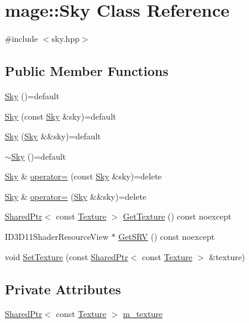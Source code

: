 \hypertarget{classmage_1_1_sky}{}\section{mage\+:\+:Sky Class Reference}
\label{classmage_1_1_sky}


{\ttfamily \#include $<$sky.\+hpp$>$}

\subsection*{Public Member Functions}
\begin{DoxyCompactItemize}
\item 
\hyperlink{classmage_1_1_sky_a4e54074f11814aee89e2554f35e551aa}{Sky} ()=default
\item 
\hyperlink{classmage_1_1_sky_ab041650afed6344cd7874308def5c35c}{Sky} (const \hyperlink{classmage_1_1_sky}{Sky} \&sky)=default
\item 
\hyperlink{classmage_1_1_sky_acf43250f4e0af2e3ab262c6c36b19a9a}{Sky} (\hyperlink{classmage_1_1_sky}{Sky} \&\&sky)=default
\item 
\hyperlink{classmage_1_1_sky_a42c605bd010c1c6576c3ecf32cd0e962}{$\sim$\+Sky} ()=default
\item 
\hyperlink{classmage_1_1_sky}{Sky} \& \hyperlink{classmage_1_1_sky_a1ed7e2e383a87025347ee63b25f0f544}{operator=} (const \hyperlink{classmage_1_1_sky}{Sky} \&sky)=delete
\item 
\hyperlink{classmage_1_1_sky}{Sky} \& \hyperlink{classmage_1_1_sky_a07e7ad68f471344d06357ea68b82ef84}{operator=} (\hyperlink{classmage_1_1_sky}{Sky} \&\&sky)=delete
\item 
\hyperlink{namespacemage_a1e01ae66713838a7a67d30e44c67703e}{Shared\+Ptr}$<$ const \hyperlink{classmage_1_1_texture}{Texture} $>$ \hyperlink{classmage_1_1_sky_abd49f247b3a376475471310d6396386b}{Get\+Texture} () const noexcept
\item 
I\+D3\+D11\+Shader\+Resource\+View $\ast$ \hyperlink{classmage_1_1_sky_ae72817d4b5015b985234183b6474f5d6}{Get\+S\+RV} () const noexcept
\item 
void \hyperlink{classmage_1_1_sky_aceb336c88ac33bb8490987812414578c}{Set\+Texture} (const \hyperlink{namespacemage_a1e01ae66713838a7a67d30e44c67703e}{Shared\+Ptr}$<$ const \hyperlink{classmage_1_1_texture}{Texture} $>$ \&texture)
\end{DoxyCompactItemize}
\subsection*{Private Attributes}
\begin{DoxyCompactItemize}
\item 
\hyperlink{namespacemage_a1e01ae66713838a7a67d30e44c67703e}{Shared\+Ptr}$<$ const \hyperlink{classmage_1_1_texture}{Texture} $>$ \hyperlink{classmage_1_1_sky_a4f9e8b3658134a04284174c419390a17}{m\+\_\+texture}
\end{DoxyCompactItemize}


